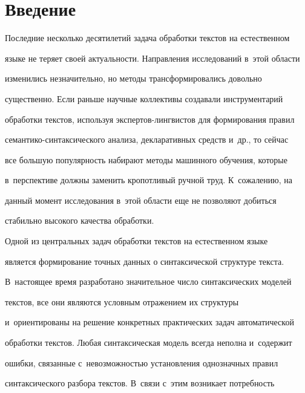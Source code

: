 
     

     \vspace*{-12pt}

     

     

\section{Введение}

     

  Последние несколько десятилетий задача обработки текстов на естественном 

языке не теряет своей актуальности. Направления исследований в~этой области 

изменились незначительно, но методы трансформировались довольно 

существенно. Если раньше научные коллективы создавали инструментарий 

обработки текстов, используя экс\-пер\-тов-лин\-гви\-стов для формирования правил 

се\-ман\-ти\-ко-син\-та\-кси\-че\-ско\-го анализа, декларативных средств и~др., то сейчас 

все большую популярность набирают методы машинного обучения, которые 

в~перспективе должны заменить кропотливый ручной труд. К~сожалению, на 

данный момент исследования в~этой области еще не позволяют добиться 

стабильно высокого качества обработки. 

  

  Одной из центральных задач обработки текстов на естественном языке 

является формирование точных данных о синтаксической структуре текста. 

В~настоящее время разработано значительное число синтаксических моделей 

текстов, все они являются условным отражением их структуры 

и~ориентированы на решение конкретных практических задач автоматической 

обработки текстов. Любая синтаксическая модель всегда неполна и~содержит 

ошибки, связанные с~невозможностью установления однозначных правил 

синтаксического разбора текстов. В~связи с~этим возникает потребность 

